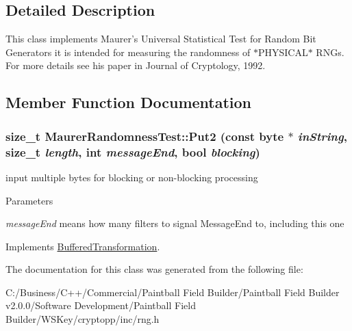 \subsection{Detailed Description}
This class implements Maurer's Universal Statistical Test for Random Bit Generators it is intended for measuring the randomness of $\ast$PHYSICAL$\ast$ RNGs. For more details see his paper in Journal of Cryptology, 1992. 

\subsection{Member Function Documentation}
\hypertarget{class_maurer_randomness_test_ae2629df58de48eafc8b8d9f0b060ff98}{
\subsubsection[{Put2}]{\setlength{\rightskip}{0pt plus 5cm}size\_\-t MaurerRandomnessTest::Put2 (const byte $\ast$ {\em inString}, \/  size\_\-t {\em length}, \/  int {\em messageEnd}, \/  bool {\em blocking})}}
\label{class_maurer_randomness_test_ae2629df58de48eafc8b8d9f0b060ff98}


input multiple bytes for blocking or non-\/blocking processing 
\begin{DoxyParams}{Parameters}
\item[{\em messageEnd}]means how many filters to signal MessageEnd to, including this one \end{DoxyParams}


Implements \hyperlink{class_buffered_transformation_ad396dcb42260f23125a35ec0e5d17d55}{BufferedTransformation}.

The documentation for this class was generated from the following file:\begin{DoxyCompactItemize}
\item 
C:/Business/C++/Commercial/Paintball Field Builder/Paintball Field Builder v2.0.0/Software Development/Paintball Field Builder/WSKey/cryptopp/inc/rng.h\end{DoxyCompactItemize}
